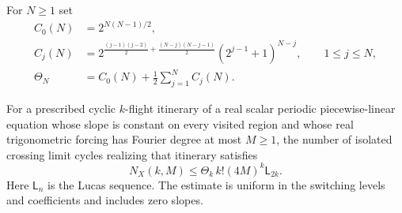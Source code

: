 For $N\ge1$ set
\begin{align}
 C_0(N)&=2^{N(N-1)/2},\label{eq:rg-C0}\\
 C_j(N)&=
 2^{\frac{(j-1)(j-2)}2+\frac{(N-j)(N-j-1)}2}
 (2^{j-1}+1)^{N-j},\qquad 1\le j\le N,\label{eq:rg-Cj}\\
 \Theta_N&=C_0(N)+\frac12\sum_{j=1}^{N}C_j(N).
 \label{eq:rg-Theta}
\end{align}

\begin{theorem}
\label{thm:rg-fixed-itinerary}
For a prescribed cyclic $k$-flight itinerary of a real scalar periodic
piecewise-linear equation whose slope is constant on every visited region and
whose real trigonometric forcing has Fourier degree at most $M\ge1$, the number of isolated
crossing limit cycles realizing that itinerary satisfies
\begin{equation}\label{eq:rg-final-bound}
 \boxed{
 N_X(k,M)\le
 \Theta_k\,k!(4M)^k\mathsf L_{2k}.}
\end{equation}
Here $\mathsf L_n$ is the Lucas sequence.  The estimate is uniform in the
switching levels and coefficients and includes zero slopes.
\end{theorem}

